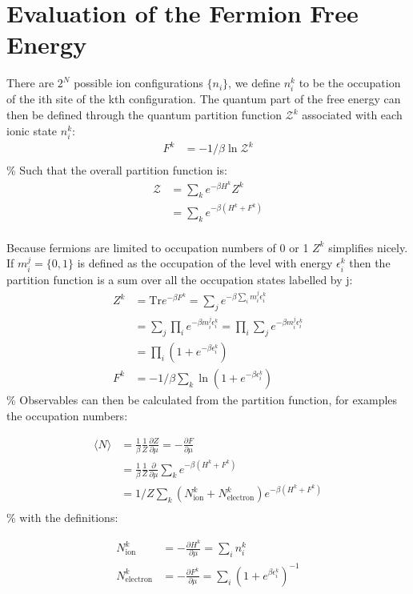 \hypertarget{evaluation-of-the-fermion-free-energy}{%
\section{Evaluation of the Fermion Free Energy}\label{evaluation-of-the-fermion-free-energy}}

There are \(2^N\) possible ion configurations \(\{ n_i \}\), we define \(n^k_i\) to be the occupation of the ith site of the kth configuration. The quantum part of the free energy can then be defined through the quantum partition function \(\mathcal{Z}^k\) associated with each ionic state \(n^k_i\): \[\begin{aligned}
F^k &= -1/\beta \ln{\mathcal{Z}^k} \\
\end{aligned}\] \% Such that the overall partition function is: \[\begin{aligned}
\mathcal{Z} &= \sum_k e^{- \beta H^k} Z^k \\
&= \sum_k e^{-\beta (H^k + F^k)} \\
\end{aligned}\]

Because fermions are limited to occupation numbers of 0 or 1 \(Z^k\) simplifies nicely. If \(m^j_i = \{0,1\}\) is defined as the occupation of the level with energy \(\epsilon^k_i\) then the partition function is a sum over all the occupation states labelled by j: \[\begin{aligned}
Z^k    &= \mathrm{Tr} e^{-\beta F^k} = \sum_j e^{-\beta \sum_i m^j_i \epsilon^k_i}\\
       &= \sum_j \prod_i e^{- \beta m^j_i \epsilon^k_i}= \prod_i \sum_j e^{- \beta m^j_i \epsilon^k_i}\\
       &= \prod_i (1 + e^{- \beta \epsilon^k_i})\\
F^k    &= -1/\beta \sum_k \ln{(1 + e^{- \beta \epsilon^k_i})}
\end{aligned}\] \% Observables can then be calculated from the partition function, for examples the occupation numbers:

\[\begin{aligned}
\langle N \rangle &= \frac{1}{\beta} \frac{1}{Z} \frac{\partial Z}{\partial \mu} = - \frac{\partial F}{\partial \mu}\\
    &= \frac{1}{\beta} \frac{1}{Z} \frac{\partial}{\partial \mu} \sum_k e^{-\beta (H^k + F^k)}\\
    &= 1/Z \sum_k (N^k_{\mathrm{ion}} + N^k_{\mathrm{electron}}) e^{-\beta (H^k + F^k)}\\
\end{aligned}\] \% with the definitions:

\[\begin{aligned}
N^k_{\mathrm{ion}} &= - \frac{\partial H^k}{\partial \mu} = \sum_i n^k_i\\
N^k_{\mathrm{electron}} &= - \frac{\partial F^k}{\partial \mu} = \sum_i \left(1 + e^{\beta \epsilon^k_i}\right)^{-1}\\
\end{aligned}\]
